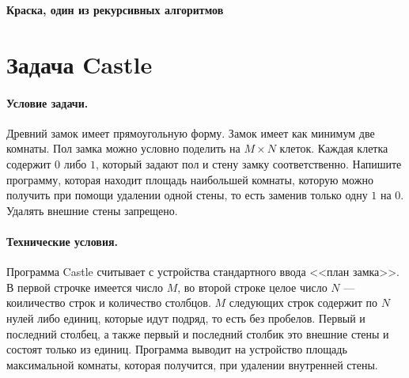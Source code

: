 \documentclass[12pt, twoside]{article}
\begin{document}
 

\begin{center}
{\LARGE\bf
Краска, один из рекурсивных алгоритмов
}
\end{center}

\section{Задача Castle}

\paragraph{Условие задачи.} Древний замок имеет прямоугольную форму. Замок имеет как минимум две комнаты. Пол замка можно условно поделить на $M\times N$ клеток. Каждая клетка содержит $0$ либо $1$, который задают пол и стену замку соответственно. Напишите программу, которая находит площадь наибольшей комнаты, которую можно получить при помощи удалении одной стены, то есть заменив только одну $1$ на $0$. Удалять внешние стены запрещено.
\paragraph{Технические условия.} Программа Castle считывает с устройства стандартного ввода <<план замка>>. В первой строчке имеется число $M$, во второй строке целое число $N$ --- коиличество строк и количество столбцов. $M$ следующих строк содержит по $N$  нулей либо единиц, которые идут подряд, то есть без пробелов. Первый и последний столбец, а также первый и последний столбик это внешние стены и состоят только из единиц. Программа выводит на устройство площадь максимальной комнаты, которая получится, при удалении внутренней стены.
\end{document}
